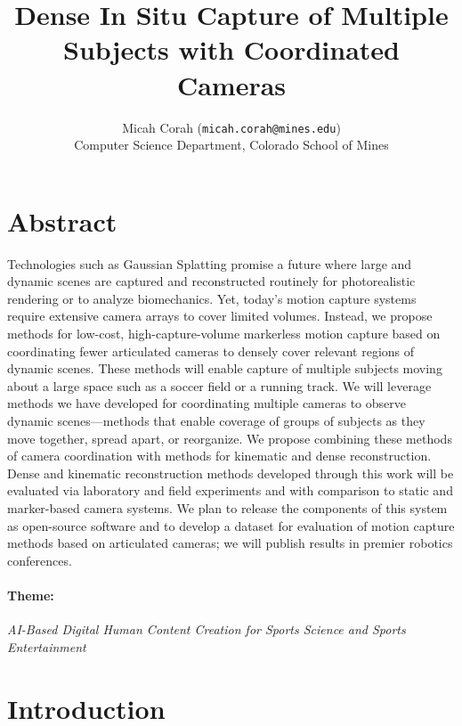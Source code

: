 \documentclass[11pt]{article}
\title{\Large Dense In Situ Capture of Multiple Subjects with Coordinated Cameras}
\author{Micah Corah (\texttt{micah.corah@mines.edu})
  \\
  Computer Science Department,
  Colorado School of Mines
}
\date{}
\begin{document}
\maketitle

\section{Abstract}


Technologies such as Gaussian Splatting promise a future where
large and dynamic scenes are captured and reconstructed routinely for
photorealistic rendering or to analyze biomechanics.
Yet, today's motion capture systems require extensive camera arrays to cover
limited volumes.
Instead, we propose methods for low-cost, high-capture-volume
markerless motion capture based on coordinating fewer articulated cameras
to densely cover relevant regions of dynamic scenes.
These methods will enable capture of multiple subjects moving
about a large space such as a soccer field or a running track.
We will leverage methods we have developed for coordinating
multiple cameras to observe dynamic scenes---methods that enable coverage of
groups of subjects as they move together, spread apart, or reorganize.
We propose combining these methods of camera coordination  with methods for
kinematic and dense reconstruction.
Dense and kinematic reconstruction methods developed through this work will be
evaluated via laboratory and field experiments and with
comparison to static and marker-based camera systems.
We plan to release the components of this system as open-source software
and to develop a %
dataset for evaluation of motion capture methods based on articulated
cameras; we will publish results in premier robotics conferences.

\paragraph{Theme:}
\emph{AI-Based Digital Human Content Creation for Sports Science and Sports
Entertainment}

\section{Introduction}
\end{document}
